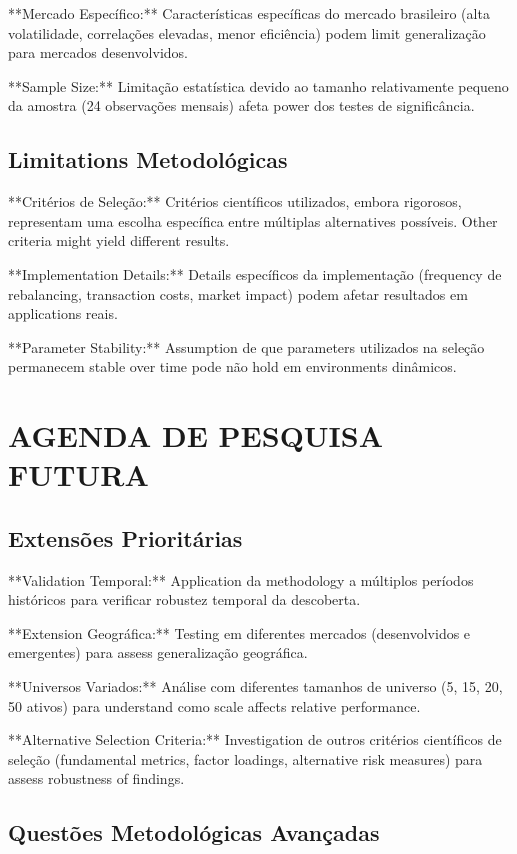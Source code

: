 **Mercado Específico:** Características específicas do mercado brasileiro (alta volatilidade, correlações elevadas, menor eficiência) podem limit generalização para mercados desenvolvidos.

**Sample Size:** Limitação estatística devido ao tamanho relativamente pequeno da amostra (24 observações mensais) afeta power dos testes de significância.

\subsection{Limitations Metodológicas}

**Critérios de Seleção:** Critérios científicos utilizados, embora rigorosos, representam uma escolha específica entre múltiplas alternatives possíveis. Other criteria might yield different results.

**Implementation Details:** Details específicos da implementação (frequency de rebalancing, transaction costs, market impact) podem afetar resultados em applications reais.

**Parameter Stability:** Assumption de que parameters utilizados na seleção permanecem stable over time pode não hold em environments dinâmicos.

\section{AGENDA DE PESQUISA FUTURA}

\subsection{Extensões Prioritárias}

**Validation Temporal:** Application da methodology a múltiplos períodos históricos para verificar robustez temporal da descoberta.

**Extension Geográfica:** Testing em diferentes mercados (desenvolvidos e emergentes) para assess generalização geográfica.

**Universos Variados:** Análise com diferentes tamanhos de universo (5, 15, 20, 50 ativos) para understand como scale affects relative performance.

**Alternative Selection Criteria:** Investigation de outros critérios científicos de seleção (fundamental metrics, factor loadings, alternative risk measures) para assess robustness of findings.

\subsection{Questões Metodológicas Avançadas}

